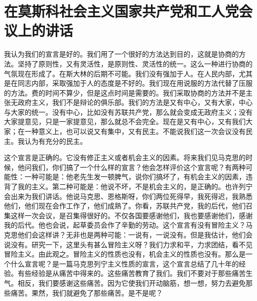 \section[在莫斯科社会主义国家共产党和工人党会议上的讲话（一九五七年十一月十六日）]{在莫斯科社会主义国家共产党和工人党会议上的讲话}


我认为我们的宣言是好的。我们用了一个很好的方法达到目的，这就是协商的方法。坚持了原则性，又有灵活性，是原则性、灵活性的统一。这么一种进行协商的气氛现在形成了。在斯大林的后期不可能。我们没有强加于人。在人民内部，尤其是在同志内部，采取强加于人的态度是不好的。我们现在用说服的方法代替了压服的方法。费的时间不算少，但是这点时间是需要的。我们采取协商的方法并不是主张无政府主义，我们不是辩论的俱乐部。我们的方法是又有中心，又有大家，中心与大家的统一。没有中心，比如没有苏联共产党，那么就会变成无政府主义；没有大家提意见，只是一家提意见，那么就总不会完全。现在是又有中心，又有我们大家；在一种意义上，也可以说又有集中，又有民主。不能说我们这一次会议没有民主。我认为有充分的民主。

这个宣言是正确的。它没有修正主义或者机会主义的因素。将来我们见马克思的时候，他问我们，你们搞了一个什么样的宣言？他会怎样评价这个宣言呢？有两种可能性：一种可能是：他老先生发一顿脾气，说你们搞坏了，有机会主义的因素，违背了我的主义。第二种可能是：他说不坏，不是机会主义的，是正确的。也许列宁会出来为我们讲话。他说马克思、恩格斯呀，你们两位死得早，我死得迟，我熟悉他们，他们现在会作工作了，他们成熟了。你看，苏联共产党，我的后代，他们召集这样一次会议，是召集得很好的。不仅各国要感谢他们，我也要感谢他们，感谢我的后代。他也会说，起草委员会作了辛勤的劳动。这个宣言有没有冒险主义？马克思他们会这样讲？无非也是两种可能：一说有，一说没有。但是我估计，他们会说没有。研究一下，这里头有甚么冒险主义呀？我们力求和平，力求团结，看不见冒险主义。由此观之。冒险主义的性质也没有，机会主义的性质也没有。那么是一个什么宣言呢？是一篇马克思列宁主义性质的宣言，这个宣言总结了几十年的经验。有些经验是从痛苦中得来的。这些痛苦教育了我们。我们不要对于那些痛苦生气。相反，我们要感谢这些痛苦。因为它使我们开动脑筋，想一想，努力去避免那些痛苦。果然，我们就避免了那些痛苦。是不是呢？


